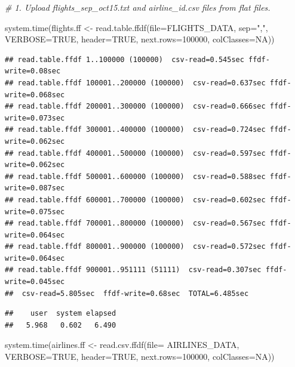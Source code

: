 \documentclass[
  12pt,
]{style/krantz}
\newenvironment{Shaded}{\begin{snugshade}}{\end{snugshade}}
\newcommand{\AttributeTok}[1]{\textcolor[rgb]{0.77,0.63,0.00}{#1}}
\newcommand{\CommentTok}[1]{\textcolor[rgb]{0.56,0.35,0.01}{\textit{#1}}}
\newcommand{\ConstantTok}[1]{\textcolor[rgb]{0.00,0.00,0.00}{#1}}
\newcommand{\DecValTok}[1]{\textcolor[rgb]{0.00,0.00,0.81}{#1}}
\newcommand{\FunctionTok}[1]{\textcolor[rgb]{0.00,0.00,0.00}{#1}}
\newcommand{\NormalTok}[1]{#1}
\newcommand{\OtherTok}[1]{\textcolor[rgb]{0.56,0.35,0.01}{#1}}
\newcommand{\StringTok}[1]{\textcolor[rgb]{0.31,0.60,0.02}{#1}}
\begin{document}
\begin{Shaded}
\begin{Highlighting}[]
\CommentTok{\# 1. Upload flights\_sep\_oct15.txt and airline\_id.csv files from flat files. }

\FunctionTok{system.time}\NormalTok{(flights.ff }\OtherTok{\textless{}{-}} \FunctionTok{read.table.ffdf}\NormalTok{(}\AttributeTok{file=}\NormalTok{FLIGHTS\_DATA,}
                                          \AttributeTok{sep=}\StringTok{","}\NormalTok{,}
                                          \AttributeTok{VERBOSE=}\ConstantTok{TRUE}\NormalTok{,}
                                          \AttributeTok{header=}\ConstantTok{TRUE}\NormalTok{,}
                                          \AttributeTok{next.rows=}\DecValTok{100000}\NormalTok{,}
                                          \AttributeTok{colClasses=}\ConstantTok{NA}\NormalTok{))}
\end{Highlighting}
\end{Shaded}

\begin{verbatim}
## read.table.ffdf 1..100000 (100000)  csv-read=0.545sec ffdf-write=0.08sec
## read.table.ffdf 100001..200000 (100000)  csv-read=0.637sec ffdf-write=0.068sec
## read.table.ffdf 200001..300000 (100000)  csv-read=0.666sec ffdf-write=0.073sec
## read.table.ffdf 300001..400000 (100000)  csv-read=0.724sec ffdf-write=0.062sec
## read.table.ffdf 400001..500000 (100000)  csv-read=0.597sec ffdf-write=0.062sec
## read.table.ffdf 500001..600000 (100000)  csv-read=0.588sec ffdf-write=0.087sec
## read.table.ffdf 600001..700000 (100000)  csv-read=0.602sec ffdf-write=0.075sec
## read.table.ffdf 700001..800000 (100000)  csv-read=0.567sec ffdf-write=0.064sec
## read.table.ffdf 800001..900000 (100000)  csv-read=0.572sec ffdf-write=0.064sec
## read.table.ffdf 900001..951111 (51111)  csv-read=0.307sec ffdf-write=0.045sec
##  csv-read=5.805sec  ffdf-write=0.68sec  TOTAL=6.485sec
\end{verbatim}

\begin{verbatim}
##    user  system elapsed 
##   5.968   0.602   6.490
\end{verbatim}

\begin{Shaded}
\begin{Highlighting}[]
\FunctionTok{system.time}\NormalTok{(airlines.ff }\OtherTok{\textless{}{-}} \FunctionTok{read.csv.ffdf}\NormalTok{(}\AttributeTok{file=}\NormalTok{ AIRLINES\_DATA,}
                             \AttributeTok{VERBOSE=}\ConstantTok{TRUE}\NormalTok{,}
                             \AttributeTok{header=}\ConstantTok{TRUE}\NormalTok{,}
                             \AttributeTok{next.rows=}\DecValTok{100000}\NormalTok{,}
                             \AttributeTok{colClasses=}\ConstantTok{NA}\NormalTok{))}
\end{Highlighting}
\end{Shaded}
\end{document}
